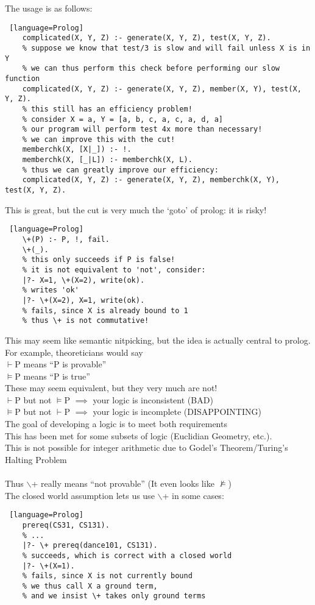 \documentclass[../../lecture_notes.tex]{subfiles}
\begin{document}
The usage is as follows:
\begin{lstlisting} [language=Prolog]
 	complicated(X, Y, Z) :- generate(X, Y, Z), test(X, Y, Z).
 	% suppose we know that test/3 is slow and will fail unless X is in Y
 	% we can thus perform this check before performing our slow function
 	complicated(X, Y, Z) :- generate(X, Y, Z), member(X, Y), test(X, Y, Z).
 	% this still has an efficiency problem! 
	% consider X = a, Y = [a, b, c, a, c, a, d, a]
 	% our program will perform test 4x more than necessary!
 	% we can improve this with the cut!
 	memberchk(X, [X|_]) :- !.
 	memberchk(X, [_|L]) :- memberchk(X, L).
 	% thus we can greatly improve our efficiency:
 	complicated(X, Y, Z) :- generate(X, Y, Z), memberchk(X, Y), test(X, Y, Z).
\end{lstlisting}
\noindent This is great, but the cut is very much the ‘goto’ of prolog: it is risky!
\begin{lstlisting} [language=Prolog]
 	\+(P) :- P, !, fail.
 	\+(_).
 	% this only succeeds if P is false! 
 	% it is not equivalent to 'not', consider:
 	|?- X=1, \+(X=2), write(ok).
 	% writes 'ok'
 	|?- \+(X=2), X=1, write(ok).
 	% fails, since X is already bound to 1
 	% thus \+ is not commutative!
\end{lstlisting}
\noindent This may seem like semantic nitpicking, but the idea is actually central to prolog.\\
For example, theoreticians would say \\
	\indent $\vdash$P means “P is provable”\\
 	\indent $\models$P means “P is true”\\
These may seem equivalent, but they very much are not!\\
	\indent  $\vdash$P but not $\models$P $\implies$ your logic is inconsistent (BAD)\\
 	\indent $\models$P but not $\vdash$P $\implies$ your logic is incomplete (DISAPPOINTING)\\
The goal of developing a logic is to meet both requirements\\
This has been met for some subsets of logic (Euclidian Geometry, etc.).\\
This is not possible for integer arithmetic due to Godel’s Theorem/Turing’s Halting Problem\\
\\
Thus $\backslash$+ really means “not provable” (It even looks like $\not\models$)\\
The closed world assumption lets us use $\backslash$+ in some cases:
\begin{lstlisting} [language=Prolog]
 	prereq(CS31, CS131).
 	% ...
 	|?- \+ prereq(dance101, CS131).
 	% succeeds, which is correct with a closed world
 	|?- \+(X=1).
 	% fails, since X is not currently bound
 	% we thus call X a ground term, 
	% and we insist \+ takes only ground terms
\end{lstlisting}
\end{document}
